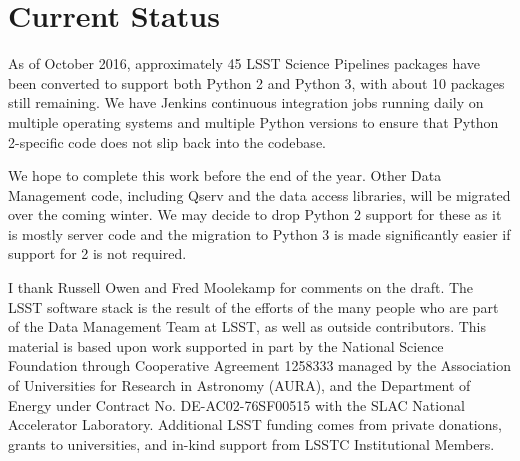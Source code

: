 \documentclass[11pt,twoside]{article}
\begin{document}
\section{Current Status}

As of October 2016, approximately 45 LSST Science Pipelines packages have been converted to support both Python 2 and Python 3, with about 10 packages still remaining.
We have Jenkins continuous integration jobs running daily on multiple operating systems and multiple Python versions to ensure that Python 2-specific code does not slip back into the codebase.

We hope to complete this work before the end of the year.
Other Data Management code, including Qserv and the data access libraries, will be migrated over the coming winter.
We may decide to drop Python 2 support for these as it is mostly server code and the migration to Python 3 is made significantly easier if support for 2 is not required.

\acknowledgements I thank Russell Owen and Fred Moolekamp for comments on the draft.
The LSST software stack is the result of the efforts of the many people who are part of the Data Management Team at LSST, as well as outside contributors.
This material is based upon work supported in part by the National Science Foundation through Cooperative Agreement 1258333 managed by the Association of Universities for Research in Astronomy (AURA), and the Department of Energy under Contract No. DE-AC02-76SF00515 with the SLAC National Accelerator Laboratory. Additional LSST funding comes from private donations, grants to universities, and in-kind support from LSSTC Institutional Members.

\end{document}
